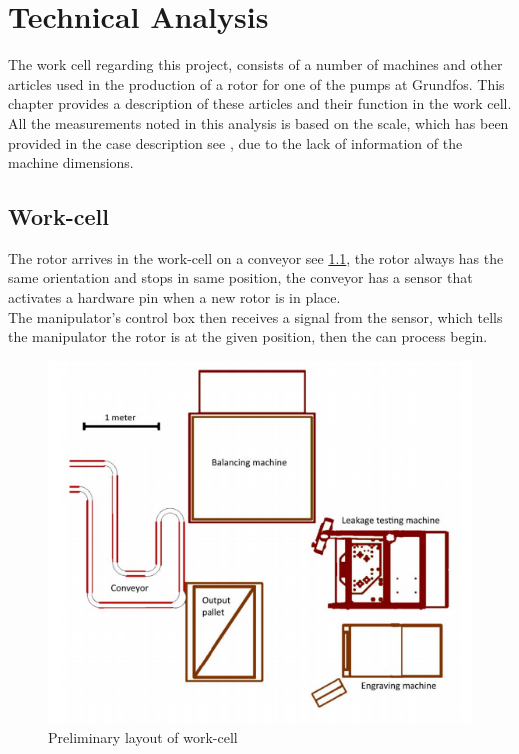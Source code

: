  \chapter{Technical Analysis} \label{TechAnalysis}
 
The work cell regarding this project, consists of a number of machines and other articles used in the production of a rotor for one of the pumps at Grundfos. This chapter provides a description of these articles and their function in the work cell\cite{robotsave}. All the measurements noted in this analysis is based on the scale, which has been provided in the case description see \cite{Case}, due to the lack of information of the machine dimensions. \\ 
 


 \section{Work-cell}
 The rotor arrives in the work-cell on a conveyor see \ref{fig:Layoutworkcell}, the rotor always has the same orientation and stops in same position, the conveyor has a sensor that activates a hardware pin when a new rotor is in place.\\
 The manipulator's control box then receives a signal from the sensor, which tells the manipulator the rotor is at the given position, then the can process begin.\\
\begin{figure}[H]
    \centering
   \includegraphics[width=\textwidth]{TechnicalAnlysis/layout.PNG}
    \caption{Preliminary layout of work-cell\cite{Case}}
    \label{fig:Layoutworkcell} 
\end{figure}

